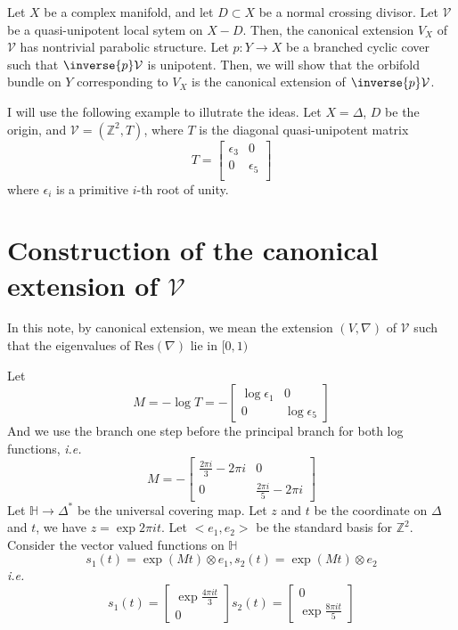 \documentclass{article}
\renewcommand{\vector}[2]{
\left[\begin{array}{c}
    {#1} \\
    {#2}
    \end{array}\right]
}
\begin{document}
Let $X$ be a complex manifold, 
and let $D \subset X$ be a normal crossing divisor.
\newcommand{\V}{\mathcal{V}}
Let $\V$ be a quasi-unipotent local sytem on $X - D$. 
Then, the canonical extension $V_X$ of $\V$ has nontrivial parabolic structure.
Let $p: Y \rightarrow X$ be a branched cyclic cover such that $\inverse{p}\V$ is
unipotent. Then, we will show that the orbifold bundle on $Y$ corresponding to $V_X$
is the canonical extension of $\inverse{p}\V$. 

I will use the following example to illutrate the ideas. 
Let $X = \Delta$, $D$ be the origin, and $\V = (\mathbb{Z}^2, T)$,
where $T$ is the diagonal quasi-unipotent matrix
\[
    T = \left[\begin{array}{cc}
        \epsilon_3 & 0 \\
        0 & \epsilon_5 \\
        \end{array}\right]
\]
where $\epsilon_i$ is a primitive $i$-th root of unity. 

\section{Construction of the canonical extension of $\V$}
In this note, by canonical extension, we mean the extension $(V, \nabla)$ of $\V$
such that the eigenvalues of $\text{Res}(\nabla)$ lie in $[0, 1)$

Let 
\[
    M = -\log T = - \left[\begin{array}{cc}
                       \log \epsilon_1 & 0\\
                        0 & \log \epsilon_5
                        \end{array}\right]
\]
And we use the branch one step before the principal branch for both log functions, \emph{i.e.}
\[
    M = -\left[\begin{array}{cc}
            \frac{2\pi i}{3} - 2\pi i & 0 \\
            0 & \frac{2\pi i}{5} - 2\pi i
            \end{array}\right]
\]
Let $\mathbb{H} \rightarrow \Delta^*$ be the universal covering map. Let $z$ and $t$ be 
the coordinate on $\Delta$ and $t$, we have $z = \exp{2\pi it}$. 
Let $<e_1, e_2>$ be the standard basis for $\mathbb{Z}^2$. Consider the vector valued 
functions on $\mathbb{H}$
\[
    s_1(t) = \exp(Mt)\otimes e_1, s_2(t) = \exp(Mt)\otimes e_2
\]
\emph{i.e.}
\[
    s_1(t) = \vector{\exp{\frac{4\pi it}{3}}}{0}
    s_2(t) = \vector{0}{\exp{\frac{8\pi it}{5}}}
\]
\end{document}
